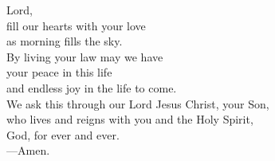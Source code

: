 \prayer


\begin{prayerverse}
Lord,\\
fill our hearts with your love\\
as morning fills the sky.\\
By living your law may we have\\
your peace in this life\\
and endless joy in the life to come.\\
We ask this through our Lord Jesus Christ, your Son,\\
who lives and reigns with you and the Holy Spirit,\\
God, for ever and ever.\\
{\color{red}---\thinspace}Amen.
\end{prayerverse}

